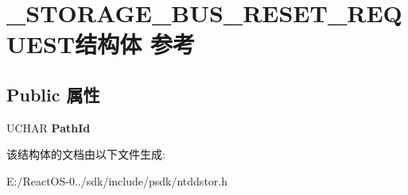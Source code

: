 \hypertarget{struct___s_t_o_r_a_g_e___b_u_s___r_e_s_e_t___r_e_q_u_e_s_t}{}\section{\+\_\+\+S\+T\+O\+R\+A\+G\+E\+\_\+\+B\+U\+S\+\_\+\+R\+E\+S\+E\+T\+\_\+\+R\+E\+Q\+U\+E\+S\+T结构体 参考}
\label{struct___s_t_o_r_a_g_e___b_u_s___r_e_s_e_t___r_e_q_u_e_s_t}
\subsection*{Public 属性}
\begin{DoxyCompactItemize}
\item 
\mbox{\label{struct___s_t_o_r_a_g_e___b_u_s___r_e_s_e_t___r_e_q_u_e_s_t_aef7bd607f4fc315002e500e71a3fd70d}} 
U\+C\+H\+AR {\bfseries Path\+Id}
\end{DoxyCompactItemize}


该结构体的文档由以下文件生成\+:\begin{DoxyCompactItemize}
\item 
E\+:/\+React\+O\+S-\/0../sdk/include/psdk/ntddstor.\+h\end{DoxyCompactItemize}
